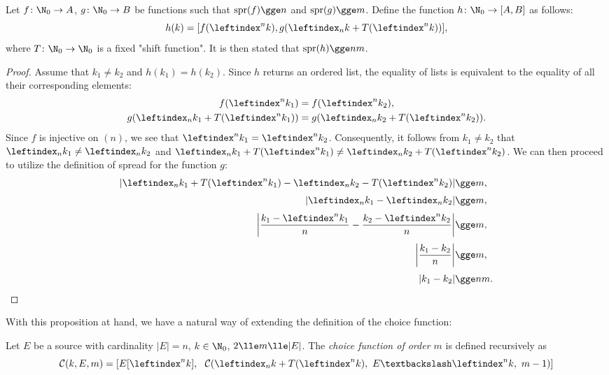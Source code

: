 \documentclass[12pt, a4paper]{article}
\renewcommand{\C}{\mathcal{C}}
\newcommand{\spr}[1]{\mathrm{spr}(#1)}
\newcommand{\lli}[1]{\leftindex_#1}
\newcommand{\lui}[1]{\leftindex^#1}
\begin{document}
\begin{proposition}
    Let $ f \colon \N_0 \to A $, $ g \colon \N_0 \to B $ be functions such that $ \spr{f} \gge n $ and $ \spr{g} \gge m $. Define the function $ h \colon \N_0 \to [A, B] $ as follows:
    \[ h(k) = [f(\lui{n}k), g(\lli{n}k + T(\lui{n}k))], \]
    where $ T \colon \N_0 \to \N_0 $ is a fixed "shift function". It is then stated that $ \spr{h} \gge nm $.
\end{proposition}
\begin{proof}
    Assume that $ k_1 \ne k_2 $ and $ h(k_1) = h(k_2) $. Since $ h $ returns an ordered list, the equality of lists is equivalent to the equality of all their corresponding elements:
    \begin{gather}
        f(\lui{n}k_1) = f(\lui{n}k_2),\label{one}\\
        g(\lli{n}k_1 + T(\lui{n}k_1)) = g(\lli{n}k_2 + T(\lui{n}k_2)).\label{two}
    \end{gather}
    Since $ f $ is injective on $ (n) $, we see that $ \lui{n}k_1 = \lui{n}k_2 $. Consequently, it follows from $ k_1 \ne k_2 $ that $ \lli{n}k_1 \ne \lli{n}k_2 $ and $ \lli{n}k_1 + T(\lui{n}k_1) \ne \lli{n}k_2 + T(\lui{n}k_2) $. We can then proceed to utilize the definition of spread for the function $ g $:
    \begin{align*}
    | \lli{n}k_1 + T(\lui{n}k_1) - \lli{n}k_2 - T(\lui{n}k_2) | &\gge m,\\[1mm]
    | \lli{n}k_1 - \lli{n}k_2 | &\gge m,\\[1mm]
    \left| \frac{k_1 - \lui{n}k_1}{n} - \frac{k_2 - \lui{n}k_2}{n} \right| &\gge m,\\[1mm]
    \left| \frac{k_1 - k_2}{n} \right| &\gge m,\\[1mm]
    | k_1 - k_2 | &\gge nm.
    \end{align*}
\end{proof}

With this proposition at hand, we have a natural way of extending the definition of the choice function:

\begin{definition}
    Let $ E $ be a source with cardinality $ |E| = n $, $ k \in \N_0 $, $ 2 \lle m \lle |E| $. The \emph{choice function of order $ m $} is defined recursively as
    \[ \C(k, E, m) = [E[\lui{n}k],\ \ \C(\lli{n}k + T(\lui{n}k),\ E\textbackslash\lui{n}k,\ m-1)] \] 
\end{definition}
\end{document}
